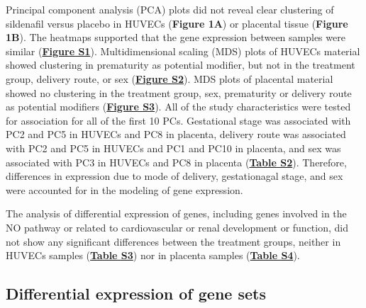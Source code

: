 \documentclass[authordate, empirical]{jote-new-article}
\begin{document}
Principal component analysis (PCA) plots did not reveal clear clustering of sildenafil versus placebo in HUVECs (\textbf{Figure 1A}) or placental tissue (\textbf{Figure 1B}). The heatmaps supported that the gene expression between samples were similar (\textbf{\href{https://journal.trialanderror.org/pub/prenatal-sildenafil-pregnancies\#supplementary-materials}{Figure S1}}). Multidimensional scaling (MDS) plots of HUVECs material showed clustering in prematurity as potential modifier, but not in the treatment group, delivery route, or sex (\textbf{\href{https://journal.trialanderror.org/pub/prenatal-sildenafil-pregnancies\#supplementary-materials}{Figure S2}}). MDS plots of placental material showed no clustering in the treatment group, sex, prematurity or delivery route as potential modifiers (\textbf{\href{https://journal.trialanderror.org/pub/prenatal-sildenafil-pregnancies\#supplementary-materials}{Figure S3}}). All of the study characteristics were tested for association for all of the first 10 PCs. Gestational stage was associated with PC2 and PC5 in HUVECs and PC8 in placenta, delivery route was associated with PC2 and PC5 in HUVECs and PC1 and PC10 in placenta, and sex was associated with PC3 in HUVECs and PC8 in placenta (\textbf{\href{https://journal.trialanderror.org/pub/prenatal-sildenafil-pregnancies\#supplementary-materials}{Table S2}}). Therefore, differences in expression due to mode of delivery, gestationagal stage, and sex were accounted for in the modeling of gene expression.



The analysis of differential expression of genes, including genes involved in the NO pathway or related to cardiovascular or renal development or function, did not show any significant differences between the treatment groups, neither in HUVECs samples (\textbf{\href{https://journal.trialanderror.org/pub/prenatal-sildenafil-pregnancies\#supplementary-materials}{Table S3}}) nor in placenta samples (\textbf{\href{https://journal.trialanderror.org/pub/prenatal-sildenafil-pregnancies\#supplementary-materials}{Table S4}}).


\subsection{Differential expression of gene sets}
\end{document}
